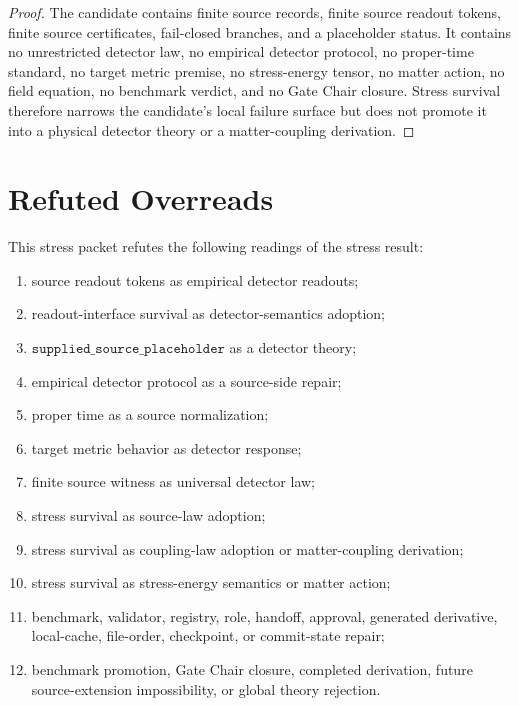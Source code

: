 \documentclass[11pt]{article}
\begin{document}
\begin{proof}
The candidate contains finite source records, finite source readout tokens,
finite source certificates, fail-closed branches, and a placeholder status.
It contains no unrestricted detector law, no empirical detector protocol, no
proper-time standard, no target metric premise, no stress-energy tensor, no
matter action, no field equation, no benchmark verdict, and no Gate Chair
closure. Stress survival therefore narrows the candidate's local failure
surface but does not promote it into a physical detector theory or a
matter-coupling derivation.
\end{proof}

\section{Refuted Overreads}

This stress packet refutes the following readings of the stress result:

\begin{enumerate}[leftmargin=*]
  \item source readout tokens as empirical detector readouts;
  \item readout-interface survival as detector-semantics adoption;
  \item \(\texttt{supplied\_source\_placeholder}\) as a detector theory;
  \item empirical detector protocol as a source-side repair;
  \item proper time as a source normalization;
  \item target metric behavior as detector response;
  \item finite source witness as universal detector law;
  \item stress survival as source-law adoption;
  \item stress survival as coupling-law adoption or matter-coupling
        derivation;
  \item stress survival as stress-energy semantics or matter action;
  \item benchmark, validator, registry, role, handoff, approval, generated
        derivative, local-cache, file-order, checkpoint, or commit-state
        repair;
  \item benchmark promotion, Gate Chair closure, completed derivation, future
        source-extension impossibility, or global theory rejection.
\end{enumerate}
\end{document}
